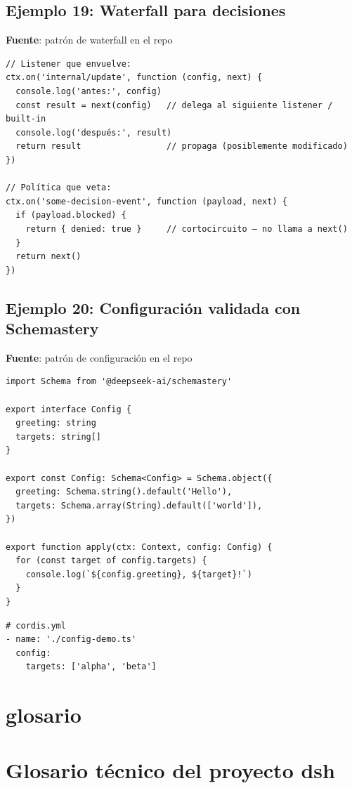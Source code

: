 \documentclass[11pt,a4paper]{article}
\begin{document}
\subsection*{Ejemplo 19: Waterfall para decisiones}


\textbf{Fuente}: patrón de waterfall en el repo


\begin{lstlisting}
// Listener que envuelve:
ctx.on('internal/update', function (config, next) {
  console.log('antes:', config)
  const result = next(config)   // delega al siguiente listener / built-in
  console.log('después:', result)
  return result                 // propaga (posiblemente modificado)
})

// Política que veta:
ctx.on('some-decision-event', function (payload, next) {
  if (payload.blocked) {
    return { denied: true }     // cortocircuito – no llama a next()
  }
  return next()
})
\end{lstlisting}


\subsection*{Ejemplo 20: Configuración validada con Schemastery}


\textbf{Fuente}: patrón de configuración en el repo


\begin{lstlisting}
import Schema from '@deepseek-ai/schemastery'

export interface Config {
  greeting: string
  targets: string[]
}

export const Config: Schema<Config> = Schema.object({
  greeting: Schema.string().default('Hello'),
  targets: Schema.array(String).default(['world']),
})

export function apply(ctx: Context, config: Config) {
  for (const target of config.targets) {
    console.log(`${config.greeting}, ${target}!`)
  }
}
\end{lstlisting}


\begin{lstlisting}
# cordis.yml
- name: './config-demo.ts'
  config:
    targets: ['alpha', 'beta']
\end{lstlisting}


\section*{glosario}

\section*{Glosario técnico del proyecto dsh}
\end{document}
